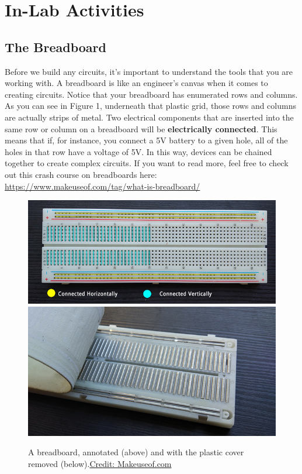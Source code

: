 \documentclass[12pt]{article}
\begin{document}
	\section*{In-Lab Activities}
	

	\subsection*{The Breadboard}
    Before we build any circuits, it’s important to understand the tools that you are working with. A breadboard is like an engineer’s canvas when it comes to creating circuits. Notice that your breadboard has enumerated rows and columns. As you can see in Figure 1, underneath that plastic grid, those rows and columns are actually strips of metal. Two electrical components that are inserted into the same row or column on a breadboard will be \textbf{electrically connected}. This means that if, for instance, you connect a 5V battery to a given hole, all of the holes in that row have a voltage of 5V. In this way, devices can be chained together to create complex circuits. If you want to read more, feel free to check out this crash course on breadboards here: \url{https://www.makeuseof.com/tag/what-is-breadboard/}\newline
    	
    \begin{figure}[h!]
    	    \begin{center}
			\includegraphics[width=\linewidth]{Figures/breadboard_annotated_670-1.jpg}
			\includegraphics[width=\linewidth]{Figures/breadboard_back_peel_670.jpg}
			\caption{A breadboard, annotated (above) and with the plastic cover removed (below).\newline  \href{https://www.makeuseof.com/tag/what-is-breadboard/}{Credit: Makeuseof.com}}
		\end{center}
    	\end{figure}
    	
\end{document}
